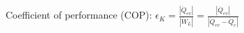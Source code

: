 Coefficient of performance (COP):  
\( \epsilon_K = \frac{|\dot{Q}_{ev}|}{|\dot{W}_L|} = \frac{|\dot{Q}_{ev}|}{|\dot{Q}_{ev} - \dot{Q}_{c}|} \)
